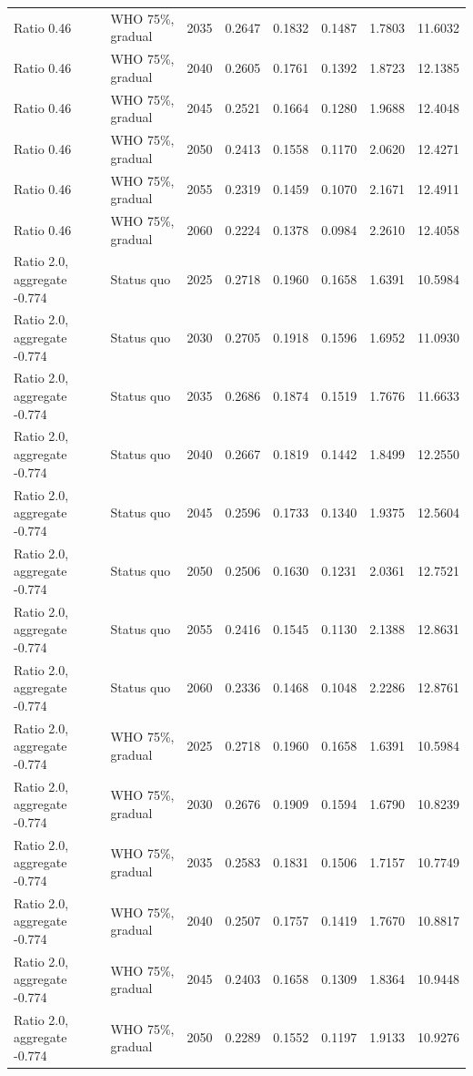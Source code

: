 \begin{longtable}{llrrrrrr}
Ratio 0.46 & WHO 75\%, gradual & 2035 & 0.2647 & 0.1832 & 0.1487 & 1.7803 & 11.6032 \\
Ratio 0.46 & WHO 75\%, gradual & 2040 & 0.2605 & 0.1761 & 0.1392 & 1.8723 & 12.1385 \\
Ratio 0.46 & WHO 75\%, gradual & 2045 & 0.2521 & 0.1664 & 0.1280 & 1.9688 & 12.4048 \\
Ratio 0.46 & WHO 75\%, gradual & 2050 & 0.2413 & 0.1558 & 0.1170 & 2.0620 & 12.4271 \\
Ratio 0.46 & WHO 75\%, gradual & 2055 & 0.2319 & 0.1459 & 0.1070 & 2.1671 & 12.4911 \\
Ratio 0.46 & WHO 75\%, gradual & 2060 & 0.2224 & 0.1378 & 0.0984 & 2.2610 & 12.4058 \\
Ratio 2.0, aggregate -0.774 & Status quo & 2025 & 0.2718 & 0.1960 & 0.1658 & 1.6391 & 10.5984 \\
Ratio 2.0, aggregate -0.774 & Status quo & 2030 & 0.2705 & 0.1918 & 0.1596 & 1.6952 & 11.0930 \\
Ratio 2.0, aggregate -0.774 & Status quo & 2035 & 0.2686 & 0.1874 & 0.1519 & 1.7676 & 11.6633 \\
Ratio 2.0, aggregate -0.774 & Status quo & 2040 & 0.2667 & 0.1819 & 0.1442 & 1.8499 & 12.2550 \\
Ratio 2.0, aggregate -0.774 & Status quo & 2045 & 0.2596 & 0.1733 & 0.1340 & 1.9375 & 12.5604 \\
Ratio 2.0, aggregate -0.774 & Status quo & 2050 & 0.2506 & 0.1630 & 0.1231 & 2.0361 & 12.7521 \\
Ratio 2.0, aggregate -0.774 & Status quo & 2055 & 0.2416 & 0.1545 & 0.1130 & 2.1388 & 12.8631 \\
Ratio 2.0, aggregate -0.774 & Status quo & 2060 & 0.2336 & 0.1468 & 0.1048 & 2.2286 & 12.8761 \\
Ratio 2.0, aggregate -0.774 & WHO 75\%, gradual & 2025 & 0.2718 & 0.1960 & 0.1658 & 1.6391 & 10.5984 \\
Ratio 2.0, aggregate -0.774 & WHO 75\%, gradual & 2030 & 0.2676 & 0.1909 & 0.1594 & 1.6790 & 10.8239 \\
Ratio 2.0, aggregate -0.774 & WHO 75\%, gradual & 2035 & 0.2583 & 0.1831 & 0.1506 & 1.7157 & 10.7749 \\
Ratio 2.0, aggregate -0.774 & WHO 75\%, gradual & 2040 & 0.2507 & 0.1757 & 0.1419 & 1.7670 & 10.8817 \\
Ratio 2.0, aggregate -0.774 & WHO 75\%, gradual & 2045 & 0.2403 & 0.1658 & 0.1309 & 1.8364 & 10.9448 \\
Ratio 2.0, aggregate -0.774 & WHO 75\%, gradual & 2050 & 0.2289 & 0.1552 & 0.1197 & 1.9133 & 10.9276 \\

\end{longtable}
